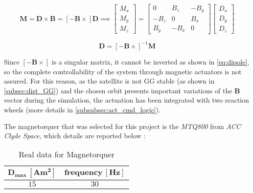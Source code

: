 \begin{equation}
    \boldsymbol{M} = \boldsymbol{D} \times \boldsymbol{B} =
	\left[ -\boldsymbol{B} \times \right] \boldsymbol{D}
	\implies
	\begin{bmatrix}
		M_x \\ M_y \\ M_z
	\end{bmatrix}
	=
	\begin{bmatrix}
		0 & B_z & -B_y \\
		-B_z & 0 & B_x \\
		B_y & -B_x & 0
	\end{bmatrix}
	\begin{bmatrix}
		D_x \\ D_y \\ D_z
	\end{bmatrix}
\end{equation}

\begin{equation} \label{eq:dipole}
	\boldsymbol{D} = \left[ -\boldsymbol{B} \times \right] ^{-1} \boldsymbol{M}
\end{equation}

Since $\left[ -\boldsymbol{B} \times \right]$ is a singular matrix, it cannot be inverted as shown in \autoref{eq:dipole}, so the complete controllability of the system through magnetic actuators is not assured.
For this reason, as the satellite is not GG stable (as shown in \autoref{subsec:dist_GG}) and the chosen orbit presents important variations of the $\boldsymbol{B}$ vector during the simulation, the actuation has been integrated with two reaction wheels (more details in \autoref{subsubsec:act_cmd_logic}).

The magnetorquer that was selected for this project is the \textit{MTQ800} from \textit{ACC Clyde Space}, which details are reported below \cite{magnetorquer_site}:
\begin{table}[H]

    \centering
    \begin{tabular}{|c|c|}
    \hline
    $\bm{D_{max} \, [Am^2]}$ & $\bm{frequency \, [Hz]}$ \\
    \hline
    $15$ & $30$ \\
    \hline
    \end{tabular}
    
    \caption{Real data for Magnetorquer}
    \label{table:magnetorquer}
    
\end{table}

